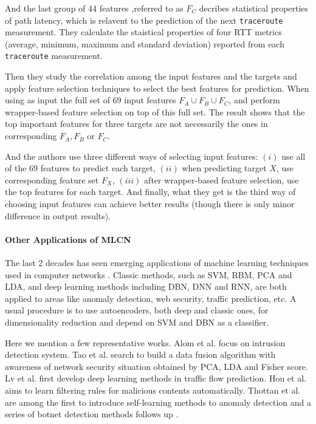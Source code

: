\documentclass[sigconf]{acmart}
\begin{document}
	And the last group of 44 features ,referred to as $F_C$ decribes statistical properties of path latency, which is relavent to the prediction of the next \texttt{traceroute} measurement. They calculate the staistical properties of four RTT metrics (average, minimum, maximum and standard deviation) reported from each \texttt{traceroute} measurement.
	
	
	Then they study the correlation among the input features and the targets and apply  feature selection techniques to select the best features for prediction. When using as input the full set of 69 input features $F_A \cup F_B \cup F_C$, and perform wrapper-based feature selection on top of this full set. The result shows that the top important features for three targets are not necessarily the ones in corresponding $F_A,F_B$ or $F_C$.
	
	
	And the authors use three different ways of selecting input features: $(i)$  use all of the 69 features to predict each target, $(ii)$ when predicting target $X$, use corresponding feature set $F_X$, $(iii)$ after wrapper-based feature selection, use the top features for each target. And finally, what they get is the third way of choosing input features can achieve better results (though there is only minor difference in output results).
	
	
	\paragraph{Other Applications of MLCN}
	The last 2 decades has seen emerging applications of machine learning techniques used in computer networks \cite{kwon2017survey}. Classic methods, such as SVM, RBM, PCA and LDA, and deep learning methods including DBN, DNN and RNN, are both applied to areas like anomaly detection, web security, traffic prediction, etc. A usual procedure is to use autoencoders, both deep and classic ones, for dimensionality reduction and depend on SVM and DBN as a classifier.
	
	Here we mention a few representative works. Alom et al. \cite{alom2015intrusion} focus on intrusion detection system. Tao et al. \cite{tao2016big} search to build a data fusion algorithm with awareness of network security situation obtained by PCA, LDA and Fisher score. Lv et al. \cite{lv2015traffic} first develop deep learning methods in traffic flow prediction. Hou et al. \cite{hou2010malicious} aims to learn filtering rules for malicious contents automatically. Thottan et al.~\cite{thottan2003anomaly} are among the first to introduce self-learning methods to anomaly detection and a series of botnet detection methods follows up \cite{ranjan2014machine, singh2014big, beigi2014towards, zhao2013botnet}.
	
\end{document}
